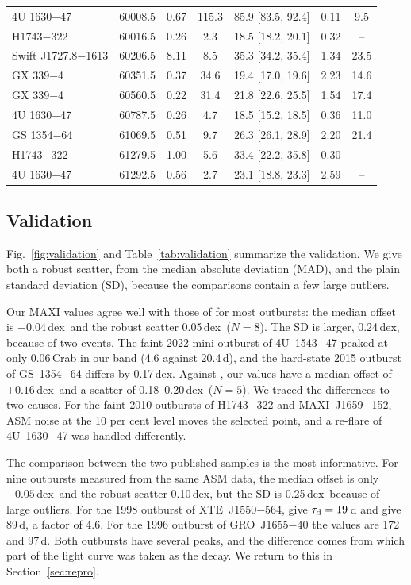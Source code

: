 \documentclass[fleqn,usenatbib]{mnras}
\newcommand{\taud}{\tau_{\rm d}}
\newcommand{\dex}{\,dex}
\begin{document}
\begin{table}
\begin{tabular}{lcccccc}
4U 1630$-$47        & 60008.5 & 0.67 & 115.3 & 85.9 [83.5, 92.4] & 0.11 & 9.5 \\
H1743$-$322         & 60016.5 & 0.26 & 2.3   & 18.5 [18.2, 20.1] & 0.32 & -- \\
Swift J1727.8$-$1613 & 60206.5 & 8.11 & 8.5  & 35.3 [34.2, 35.4] & 1.34 & 23.5 \\
GX 339$-$4          & 60351.5 & 0.37 & 34.6  & 19.4 [17.0, 19.6] & 2.23 & 14.6 \\
GX 339$-$4          & 60560.5 & 0.22 & 31.4  & 21.8 [22.6, 25.5] & 1.54 & 17.4 \\
4U 1630$-$47        & 60787.5 & 0.26 & 4.7   & 18.5 [15.2, 18.5] & 0.36 & 11.0 \\
GS 1354$-$64        & 61069.5 & 0.51 & 9.7   & 26.3 [26.1, 28.9] & 2.20 & 21.4 \\
H1743$-$322         & 61279.5 & 1.00 & 5.6   & 33.4 [22.2, 35.8] & 0.30 & -- \\
4U 1630$-$47        & 61292.5 & 0.56 & 2.7   & 23.1 [18.8, 23.3] & 2.59 & -- \\
\bottomrule
\end{tabular}
\end{table}

\subsection{Validation}
\label{sec:val_results}

Fig.~\ref{fig:validation} and Table~\ref{tab:validation} summarize the validation. We give both a robust scatter, from the median absolute deviation (MAD), and the plain standard deviation (SD), because the comparisons contain a few large outliers.

Our MAXI values agree well with those of \citet{Saraswati2025} for most outbursts: the median offset is $-0.04$\dex\ and the robust scatter 0.05\dex\ ($N=8$). The SD is larger, 0.24\dex, because of two events. The faint 2022 mini-outburst of 4U~1543$-$47 peaked at only 0.06\,Crab in our band (4.6 against 20.4\,d), and the hard-state 2015 outburst of GS~1354$-$64 differs by 0.17\dex. Against \citet{YanYu2015}, our values have a median offset of $+0.16$\dex\ and a scatter of 0.18--0.20\dex\ ($N=5$). We traced the differences to two causes. For the faint 2010 outbursts of H1743$-$322 and MAXI~J1659$-$152, ASM noise at the 10 per cent level moves the selected point, and a re-flare of 4U~1630$-$47 was handled differently.

The comparison between the two published samples is the most informative. For nine outbursts measured from the same ASM data, the median offset is only $-0.05$\dex\ and the robust scatter 0.10\dex, but the SD is 0.25\dex\ because of large outliers. For the 1998 outburst of XTE~J1550$-$564, \citet{YanYu2015} give $\taud=19$\,d and \citet{Saraswati2025} give 89\,d, a factor of 4.6. For the 1996 outburst of GRO~J1655$-$40 the values are 172 and 97\,d. Both outbursts have several peaks, and the difference comes from which part of the light curve was taken as the decay. We return to this in Section~\ref{sec:repro}.
\end{document}

